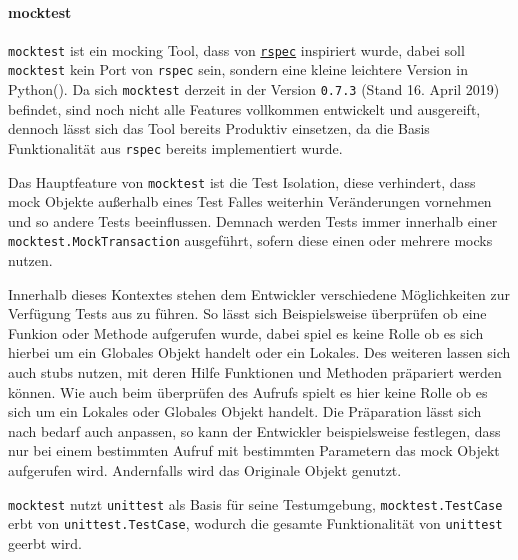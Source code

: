 \paragraph{mocktest}\label{python-tools:mocktest}\mbox{}
\newline
\lstinline{mocktest} ist ein \gls{mock}ing Tool, dass von
\href{http://rspec.info/}{\lstinline{rspec}}
inspiriert wurde, dabei soll \lstinline{mocktest} kein
Port von \lstinline{rspec} sein, sondern eine kleine leichtere
Version in Python(\cite{mocktest:doc}).
Da sich \lstinline{mocktest} derzeit in der Version \lstinline{0.7.3} (Stand 16.
April 2019) befindet, sind noch nicht alle Features vollkommen entwickelt und
ausgereift, dennoch lässt sich das Tool bereits Produktiv einsetzen, da die
Basis Funktionalität aus \lstinline{rspec} bereits implementiert
wurde.
\newline

Das Hauptfeature von \lstinline{mocktest} ist die Test Isolation, diese
verhindert, dass \Gls{mock} Objekte außerhalb eines Test Falles weiterhin
Veränderungen vornehmen und so andere Tests beeinflussen. Demnach werden Tests
immer innerhalb einer \lstinline{mocktest.MockTransaction} ausgeführt, sofern
diese einen oder mehrere \Glspl{mock} nutzen.

Innerhalb dieses Kontextes stehen dem Entwickler verschiedene Möglichkeiten zur
Verfügung Tests aus zu führen. So lässt sich Beispielsweise überprüfen ob eine
Funkion oder Methode aufgerufen wurde, dabei spiel es keine Rolle ob es sich
hierbei um ein Globales Objekt handelt oder ein Lokales.
Des weiteren lassen sich auch \Glspl{stub} nutzen, mit deren Hilfe Funktionen
und Methoden präpariert werden können. Wie auch beim überprüfen des Aufrufs
spielt es hier keine Rolle ob es sich um ein Lokales oder Globales Objekt
handelt.
Die Präparation lässt sich nach bedarf auch anpassen, so kann der Entwickler
beispielsweise festlegen, dass nur bei einem bestimmten Aufruf mit bestimmten
Parametern das \Gls{mock} Objekt aufgerufen wird. Andernfalls wird das Originale
Objekt genutzt.
\newline

\lstinline{mocktest} nutzt \lstinline{unittest} als Basis für seine
Testumgebung, \lstinline{mocktest.TestCase} erbt von
\lstinline{unittest.TestCase}, wodurch die gesamte Funktionalität von
\lstinline{unittest} geerbt wird.

